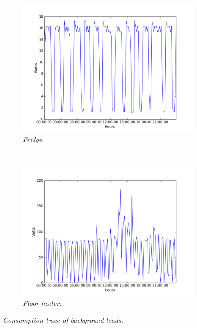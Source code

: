 \begin{figure}[!h]
\centering
    \begin{subfigure}[b]{0.52\textwidth}
            \includegraphics[width=\textwidth]{img/fridge.png}
            \caption[Peaks]{\emph{\small Fridge.}}
            \label{fig:fridgePowerTrace}
        \end{subfigure}%
        ~
        \begin{subfigure}[b]{0.52\textwidth}
            \includegraphics[width=\textwidth]{img/floor_heating.png}
            \caption[Peaks]{\emph{\small Floor heater.}}
            \label{fig:floorHeaterPowerTrace}
        \end{subfigure}%
\caption[Peaks]{\emph{\small Consumption trace of background loads.}}
\label{PowerTrace}
\end{figure}

